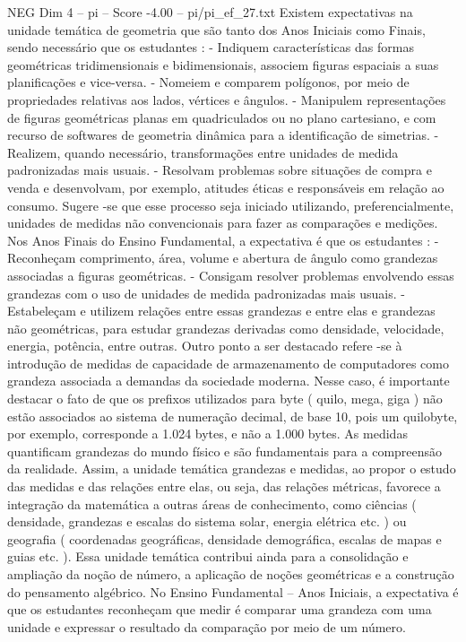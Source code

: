 \begin{textsample}{NEG Dim 4 – pi – Score -4.00 – pi/pi\_ef\_27.txt}
Existem expectativas na unidade temática de geometria que são tanto dos Anos Iniciais como Finais, sendo necessário que os estudantes : - Indiquem características das formas geométricas tridimensionais e bidimensionais, associem figuras espaciais a suas planificações e vice-versa. - Nomeiem e comparem polígonos, por meio de propriedades relativas aos lados, vértices e ângulos. - Manipulem representações de figuras geométricas planas em quadriculados ou no plano cartesiano, e com recurso de softwares de geometria dinâmica para a identificação de simetrias. - Realizem, quando necessário, transformações entre unidades de medida padronizadas mais usuais. - Resolvam problemas sobre situações de compra e venda e desenvolvam, por exemplo, atitudes éticas e responsáveis em relação ao consumo.
Sugere -se que esse processo seja iniciado utilizando, preferencialmente, unidades de medidas não convencionais para fazer as comparações e medições.
Nos Anos Finais do Ensino Fundamental, a expectativa é que os estudantes : - Reconheçam comprimento, área, volume e abertura de ângulo como grandezas associadas a figuras geométricas. - Consigam resolver problemas envolvendo essas grandezas com o uso de unidades de medida padronizadas mais usuais. - Estabeleçam e utilizem relações entre essas grandezas e entre elas e grandezas não geométricas, para estudar grandezas derivadas como densidade, velocidade, energia, potência, entre outras.
Outro ponto a ser destacado refere -se à introdução de medidas de capacidade de armazenamento de computadores como grandeza associada a demandas da sociedade moderna.
Nesse caso, é importante destacar o fato de que os prefixos utilizados para byte ( quilo, mega, giga ) não estão associados ao sistema de numeração decimal, de base 10, pois um quilobyte, por exemplo, corresponde a 1.024 bytes, e não a 1.000 bytes.
As medidas quantificam grandezas do mundo físico e são fundamentais para a compreensão da realidade.
Assim, a unidade temática grandezas e medidas, ao propor o estudo das medidas e das relações entre elas, ou seja, das relações métricas, favorece a integração da matemática a outras áreas de conhecimento, como ciências ( densidade, grandezas e escalas do sistema solar, energia elétrica etc. ) ou geografia ( coordenadas geográficas, densidade demográfica, escalas de mapas e guias etc. ).
Essa unidade temática contribui ainda para a consolidação e ampliação da noção de número, a aplicação de noções geométricas e a construção do pensamento algébrico.
No Ensino Fundamental – Anos Iniciais, a expectativa é que os estudantes reconheçam que medir é comparar uma grandeza com uma unidade e expressar o resultado da comparação por meio de um número.

\end{textsample}
